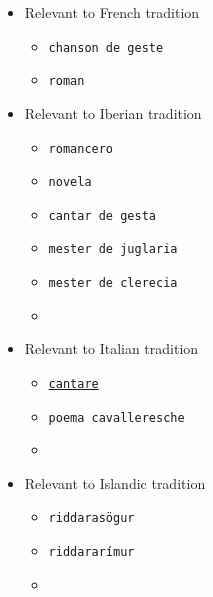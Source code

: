 \begin{itemize}
    \begin{multicols}{2}
        \begin{itemize}
            \item Relevant to French tradition
                \begin{itemize}
                    \item \texttt{chanson de geste}
                    \item \texttt{roman}
                \end{itemize}
            \item Relevant to Iberian tradition
            \begin{itemize}
                \item \texttt{romancero}
                \item \texttt{novela}
                \item \texttt{cantar de gesta}
                \item \texttt{mester de juglaria}
                \item \texttt{mester de clerecia}
                \item {}
            \end{itemize}
            \item Relevant to Italian tradition
            \begin{itemize}
                \item \href{https://www.oxfordbibliographies.com/display/document/obo-9780195396584/obo-9780195396584-0199.xml}{\texttt{cantare}}
                \item \texttt{poema cavalleresche}
                \item {}
            \end{itemize}
            \item Relevant to Islandic tradition
                \begin{itemize}
                    \item \texttt{riddarasögur}
                    \item \texttt{riddararímur}
                    \item {}

\end{itemize}
\end{itemize}
\end{multicols}
\end{itemize}
